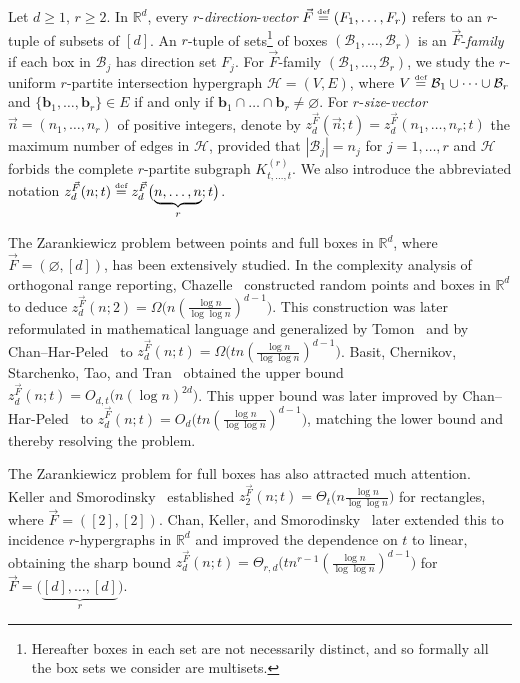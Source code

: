 \documentclass[11pt]{article}
\theoremstyle{definition}
\newcommand*{\eqdef}{\stackrel{\mbox{\normalfont\tiny def}}{=}} %
\newcommand*{\R}{\mathbb{R}}                                    %
\newcommand*{\cH}{\mathcal{H}}
\newcommand*{\vF}{\vec{F}}
\newcommand*{\cB}{\mathcal{B}}
\newcommand*{\vn}{\vec{n}}
\begin{document}
Let $d \ge 1, \, r \ge 2$. In $\R^d$, every $r$-\emph{direction}-\emph{vector} $\vF \eqdef (F_1, \dots, F_r)$ refers to an $r$-tuple of subsets of $[d]$. An $r$-tuple of sets\footnote{Hereafter boxes in each set are not necessarily distinct, and so formally all the box sets we consider are multisets.} of boxes $(\cB_1, \dots, \cB_r)$ is an $\vF$-\emph{family} if each box in $\cB_j$ has direction set $F_j$. For $\vF$-family $(\cB_1, \dots, \cB_r)$, we study the $r$-uniform $r$-partite intersection hypergraph $\cH = (V, E)$, where $V \eqdef \cB_1 \cup \dots \cup \cB_r$ and $\{\bm{b}_1, \dots, \bm{b}_r\} \in E$ if and only if $\bm{b}_1 \cap \dots \cap \bm{b}_r \ne \varnothing$. For $r$-\emph{size}-\emph{vector} $\vn = (n_1, \dots, n_r)$ of positive integers, denote by $z_d^{\vF}(\vn; t) = z_d^{\vF}(n_1, \dots, n_r; t)$ the maximum number of edges in $\cH$, provided that $|\cB_j| = n_j$ for $j = 1, \dots, r$ and $\cH$ forbids the complete $r$-partite subgraph $K_{t, \dots, t}^{(r)}$. We also introduce the abbreviated notation $z_d^{\vF}(n; t) \eqdef z_d^{\vF} \bigl( \underbrace{n, \dots, n}_r; t \bigr)$. 

The Zarankiewicz problem between points and full boxes in $\R^d$, where $\vF = (\varnothing, [d])$, has been extensively studied. In the complexity analysis of orthogonal range reporting, Chazelle~\cite{chazelle} constructed random points and boxes in $\R^d$ to deduce $z_d^{\vF}(n; 2) = \Omega \bigl( n(\frac{\log n}{\log\log n})^{d-1} \bigr)$. This construction was later reformulated in mathematical language and generalized by Tomon~\cite{tomon} and by Chan--Har-Peled~\cite{chan_har-peled} to $z_d^{\vF}(n; t) = \Omega \bigl( tn(\frac{\log n}{\log\log n})^{d-1} \bigr)$. Basit, Chernikov, Starchenko, Tao, and Tran~\cite{basit_etal} obtained the upper bound $z_d^{\vF}(n; t) = O_{d, t} \bigl( n (\log n)^{2d} \bigr)$. This upper bound was later improved by Chan--Har-Peled~\cite{chan_har-peled} to $z_d^{\vF}(n; t) = O_d \bigl( tn(\frac{\log n}{\log\log n})^{d-1} \bigr)$, matching the lower bound and thereby resolving the problem. 

The Zarankiewicz problem for full boxes has also attracted much attention. Keller and Smorodinsky~\cite{keller_smorodinsky} established $z_2^{\vF}(n;t) = \Theta_t \bigl( n \frac{\log n}{\log\log n}\bigr)$ for rectangles, where $\vF = ([2], [2])$. Chan, Keller, and Smorodinsky~\cite{chan_keller_smorodinsky_arxiv} later extended this to incidence $r$-hypergraphs in $\R^d$ and improved the dependence on $t$ to linear, obtaining the sharp bound $z_d^{\vF}(n; t) = \Theta_{r, d} \bigl( tn^{r-1}(\frac{\log n}{\log\log n})^{d-1} \bigr)$ for $\vF = \bigl( \underbrace{[d], \dots, [d]}_{r} \bigr)$. 
\end{document}
